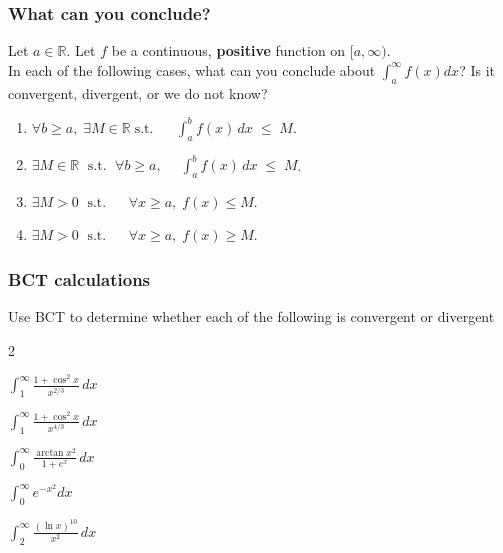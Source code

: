 \documentclass[14pt]{beamer}
\begin{document}
	\begin{frame}[t]
		\fontsize{13}{13}\selectfont
		\frametitle{What can you conclude?}

		Let $a \in \mathbb{R}$. Let $f$ be a continuous, {\bfseries positive} function
		on $[a, \infty)$. \\ In each of the following cases, what can you conclude about
		$\displaystyle \int_{a}^{\infty}f(x) dx$? \; Is it convergent, divergent, or
		we do not know?

		\begin{enumerate}
			\item $\displaystyle \forall b \geq a, \; \exists M \in \mathbb{R}\; \text{
				s.t. }\; \quad \int_{a}^{b}f(x)\,dx \; \leq \; M$.

			\item $\displaystyle \exists M \in \mathbb{R}\; \text{ s.t. }\; \forall b \geq
				a, \; \quad \int_{a}^{b}f(x)\, dx \; \leq \; M$.
				\vspace{.3cm}

			\item $\displaystyle \exists M >0 \; \text{ s.t. }\; \quad \forall x \geq a
				, \; f(x) \leq M$.
				\vspace{.3cm}

			\item $\displaystyle \exists M >0 \; \text{ s.t. }\; \quad \forall x \geq a
				, \; f(x) \geq M$.
		\end{enumerate}
	\end{frame}

	\begin{frame}[t]
		\frametitle{BCT calculations}

		Use BCT to determine whether each of the following is convergent or
		divergent

		\begin{enumerate}
		\end{enumerate}
	\end{frame}
\end{document}
